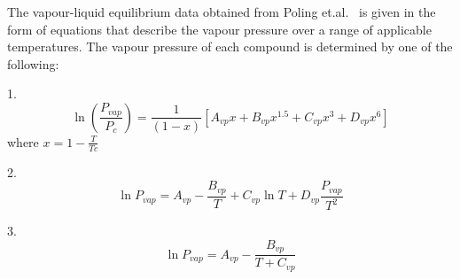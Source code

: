 			The vapour-liquid equilibrium data obtained from Poling et.al.~\cite{GasLiquidProperties} is given in the form of equations that describe the vapour pressure over a range of applicable temperatures. The vapour pressure of each compound is determined by one of the following:
			\begin{list}{method}{}
				\item 1. \begin{equation}
							\ln \left(\frac{P_{vap}}{P_{c}}\right) = \frac{1}{\left(1-x\right)}\left[A_{vp}x + B_{vp}x^{1.5} + C_{vp}x^{3} + D_{vp}x^{6}\right] \label{Method1}
						\end{equation}
						where $x = 1 - \frac{T}{Tc}$
				\item 2. \begin{equation}
							\ln P_{vap} = A_{vp} - \frac{B_{vp}}{T} + C_{vp}\ln T + D_{vp} \frac{P_{vap}}{T^{2}} \label{Method2}
						\end{equation}
				\item 3. \begin{equation}
							\ln P_{vap} = A_{vp} - \frac{B_{vp}}{T + C_{vp}} \label{Method3}
						\end{equation}
			\end{list}
				
			
